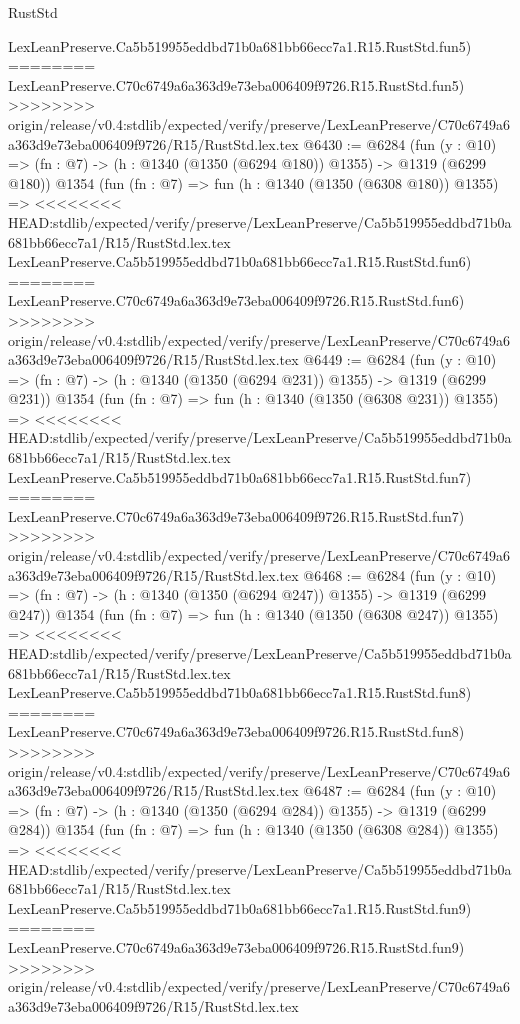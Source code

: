 \begin{lexlean}{RustStd}
\begin{coremodule}
{\begin{coremodule}
{{{{{{{{{{{{{{    LexLeanPreserve.Ca5b519955eddbd71b0a681bb66ecc7a1.R15.RustStd.fun5)
========
    LexLeanPreserve.C70c6749a6a363d9e73eba006409f9726.R15.RustStd.fun5)
>>>>>>>> origin/release/v0.4:stdlib/expected/verify/preserve/LexLeanPreserve/C70c6749a6a363d9e73eba006409f9726/R15/RustStd.lex.tex
@6430 := @6284
    (fun (y : @10) => (fn : @7) -> (h : @1340 (@1350 (@6294 @180)) @1355) -> @1319 (@6299 @180))
    @1354
    (fun (fn : @7) =>
    fun (h : @1340 (@1350 (@6308 @180)) @1355) =>
<<<<<<<< HEAD:stdlib/expected/verify/preserve/LexLeanPreserve/Ca5b519955eddbd71b0a681bb66ecc7a1/R15/RustStd.lex.tex
    LexLeanPreserve.Ca5b519955eddbd71b0a681bb66ecc7a1.R15.RustStd.fun6)
========
    LexLeanPreserve.C70c6749a6a363d9e73eba006409f9726.R15.RustStd.fun6)
>>>>>>>> origin/release/v0.4:stdlib/expected/verify/preserve/LexLeanPreserve/C70c6749a6a363d9e73eba006409f9726/R15/RustStd.lex.tex
@6449 := @6284
    (fun (y : @10) => (fn : @7) -> (h : @1340 (@1350 (@6294 @231)) @1355) -> @1319 (@6299 @231))
    @1354
    (fun (fn : @7) =>
    fun (h : @1340 (@1350 (@6308 @231)) @1355) =>
<<<<<<<< HEAD:stdlib/expected/verify/preserve/LexLeanPreserve/Ca5b519955eddbd71b0a681bb66ecc7a1/R15/RustStd.lex.tex
    LexLeanPreserve.Ca5b519955eddbd71b0a681bb66ecc7a1.R15.RustStd.fun7)
========
    LexLeanPreserve.C70c6749a6a363d9e73eba006409f9726.R15.RustStd.fun7)
>>>>>>>> origin/release/v0.4:stdlib/expected/verify/preserve/LexLeanPreserve/C70c6749a6a363d9e73eba006409f9726/R15/RustStd.lex.tex
@6468 := @6284
    (fun (y : @10) => (fn : @7) -> (h : @1340 (@1350 (@6294 @247)) @1355) -> @1319 (@6299 @247))
    @1354
    (fun (fn : @7) =>
    fun (h : @1340 (@1350 (@6308 @247)) @1355) =>
<<<<<<<< HEAD:stdlib/expected/verify/preserve/LexLeanPreserve/Ca5b519955eddbd71b0a681bb66ecc7a1/R15/RustStd.lex.tex
    LexLeanPreserve.Ca5b519955eddbd71b0a681bb66ecc7a1.R15.RustStd.fun8)
========
    LexLeanPreserve.C70c6749a6a363d9e73eba006409f9726.R15.RustStd.fun8)
>>>>>>>> origin/release/v0.4:stdlib/expected/verify/preserve/LexLeanPreserve/C70c6749a6a363d9e73eba006409f9726/R15/RustStd.lex.tex
@6487 := @6284
    (fun (y : @10) => (fn : @7) -> (h : @1340 (@1350 (@6294 @284)) @1355) -> @1319 (@6299 @284))
    @1354
    (fun (fn : @7) =>
    fun (h : @1340 (@1350 (@6308 @284)) @1355) =>
<<<<<<<< HEAD:stdlib/expected/verify/preserve/LexLeanPreserve/Ca5b519955eddbd71b0a681bb66ecc7a1/R15/RustStd.lex.tex
    LexLeanPreserve.Ca5b519955eddbd71b0a681bb66ecc7a1.R15.RustStd.fun9)
========
    LexLeanPreserve.C70c6749a6a363d9e73eba006409f9726.R15.RustStd.fun9)
>>>>>>>> origin/release/v0.4:stdlib/expected/verify/preserve/LexLeanPreserve/C70c6749a6a363d9e73eba006409f9726/R15/RustStd.lex.tex
}}}}}}}}}}}}}}
\end{coremodule}}
\end{coremodule}
\end{lexlean}
